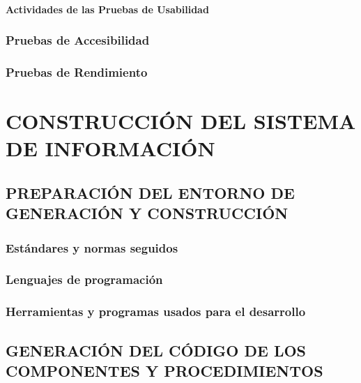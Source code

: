 \documentclass[11pt]{report} %
\begin{document}
\subsubsection{Actividades de las Pruebas de Usabilidad} 


\subsection{Pruebas de Accesibilidad} 

\subsection{Pruebas de Rendimiento} 


\newpage
\chapter{CONSTRUCCIÓN DEL SISTEMA DE INFORMACIÓN}
\noindent{}

\newpage


\section{PREPARACIÓN DEL ENTORNO DE GENERACIÓN Y CONSTRUCCIÓN}

\subsection{Estándares y normas seguidos}


\subsection{Lenguajes de programación}


\subsection{Herramientas y programas usados para el desarrollo}


\newpage
\section{GENERACIÓN DEL CÓDIGO DE LOS COMPONENTES Y PROCEDIMIENTOS}
\end{document}
